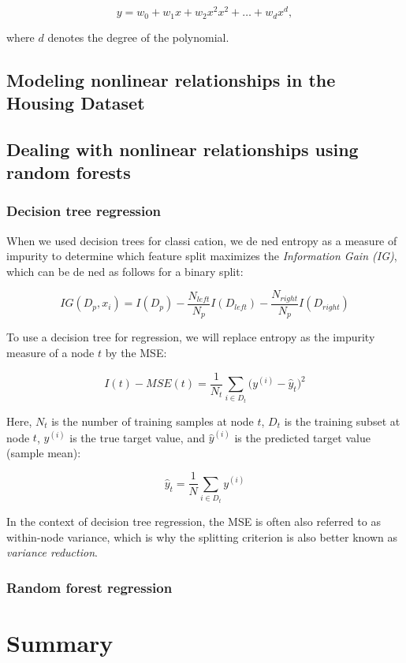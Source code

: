 \documentclass[letterpaper]{report}
\begin{document}
\[
y = w_0 + w_1 x + w_2 x^2 x^2 + \dots + w_d x^d,
\]

where $d$ denotes the degree of the polynomial.

\subsection{Modeling nonlinear relationships in the Housing Dataset}
\subsection{Dealing with nonlinear relationships using random forests}
\subsubsection{Decision tree regression}

When we used decision trees for classi cation, we de ned entropy as a measure of impurity to determine which feature split maximizes the \textit{Information Gain (IG)}, which can be de ned as follows for a binary split:

\[
IG(D_p, x_i) = I(D_p) - \frac{N_{left}}{N_{p}} I (D_{left}) - \frac{N_{right}}{N_p} I (D_{right})
\]

To use a decision tree for regression, we will replace entropy as the impurity measure of a node $t$ by the MSE:

\[
I(t) - MSE(t) = \frac{1}{N_t} \sum_{i \in D_t} \big( y^{(i)} - \hat{y}_t  \big)^2
\]

Here, $N_t$ is the number of training samples at node $t$, $D_t$ is the training subset at node $t$, $y^{(i)}$ is the true target value, and $\hat{y}^{(i)}$ is the predicted target value (sample mean):

\[
\hat{y}_t = \frac{1}{N} \sum_{i \in D_t} y^{(i)}
\]

In the context of decision tree regression, the MSE is often also referred to as within-node variance, which is why the splitting criterion is also better known
as \textit{variance reduction}. 

\subsubsection{Random forest regression}
\section{Summary}
\end{document}
